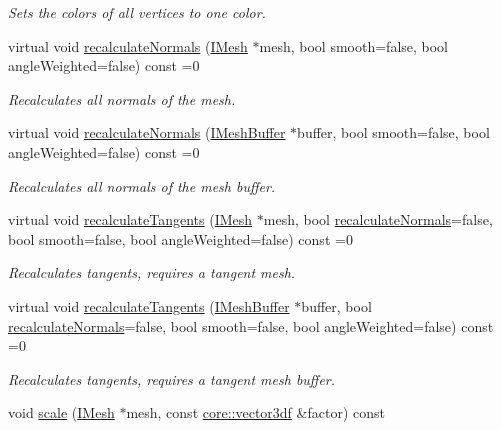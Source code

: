 \begin{DoxyCompactItemize}
\begin{DoxyCompactList}\small\item\em Sets the colors of all vertices to one color. \end{DoxyCompactList}\item 
virtual void \hyperlink{classirr_1_1scene_1_1IMeshManipulator_a8dba16b7eedeac07761c9c1247944429}{recalculate\+Normals} (\hyperlink{classirr_1_1scene_1_1IMesh}{I\+Mesh} $\ast$mesh, bool smooth=false, bool angle\+Weighted=false) const =0
\begin{DoxyCompactList}\small\item\em Recalculates all normals of the mesh. \end{DoxyCompactList}\item 
virtual void \hyperlink{classirr_1_1scene_1_1IMeshManipulator_a94d8390182763e608ca43978b8866d11}{recalculate\+Normals} (\hyperlink{classirr_1_1scene_1_1IMeshBuffer}{I\+Mesh\+Buffer} $\ast$buffer, bool smooth=false, bool angle\+Weighted=false) const =0
\begin{DoxyCompactList}\small\item\em Recalculates all normals of the mesh buffer. \end{DoxyCompactList}\item 
virtual void \hyperlink{classirr_1_1scene_1_1IMeshManipulator_a0ea43e8c4e8489551228b3005d325cd6}{recalculate\+Tangents} (\hyperlink{classirr_1_1scene_1_1IMesh}{I\+Mesh} $\ast$mesh, bool \hyperlink{classirr_1_1scene_1_1IMeshManipulator_a8dba16b7eedeac07761c9c1247944429}{recalculate\+Normals}=false, bool smooth=false, bool angle\+Weighted=false) const =0
\begin{DoxyCompactList}\small\item\em Recalculates tangents, requires a tangent mesh. \end{DoxyCompactList}\item 
virtual void \hyperlink{classirr_1_1scene_1_1IMeshManipulator_a6bea784eb6cf29bdd771dde3903a2758}{recalculate\+Tangents} (\hyperlink{classirr_1_1scene_1_1IMeshBuffer}{I\+Mesh\+Buffer} $\ast$buffer, bool \hyperlink{classirr_1_1scene_1_1IMeshManipulator_a8dba16b7eedeac07761c9c1247944429}{recalculate\+Normals}=false, bool smooth=false, bool angle\+Weighted=false) const =0
\begin{DoxyCompactList}\small\item\em Recalculates tangents, requires a tangent mesh buffer. \end{DoxyCompactList}\item 
void \hyperlink{classirr_1_1scene_1_1IMeshManipulator_abd2a0bdd00605f638f619177e64b1cce}{scale} (\hyperlink{classirr_1_1scene_1_1IMesh}{I\+Mesh} $\ast$mesh, const \hyperlink{namespaceirr_1_1core_ae6e2b2a6c552833ebbd5b7463d03586b}{core\+::vector3df} \&factor) const

\end{DoxyCompactItemize}
